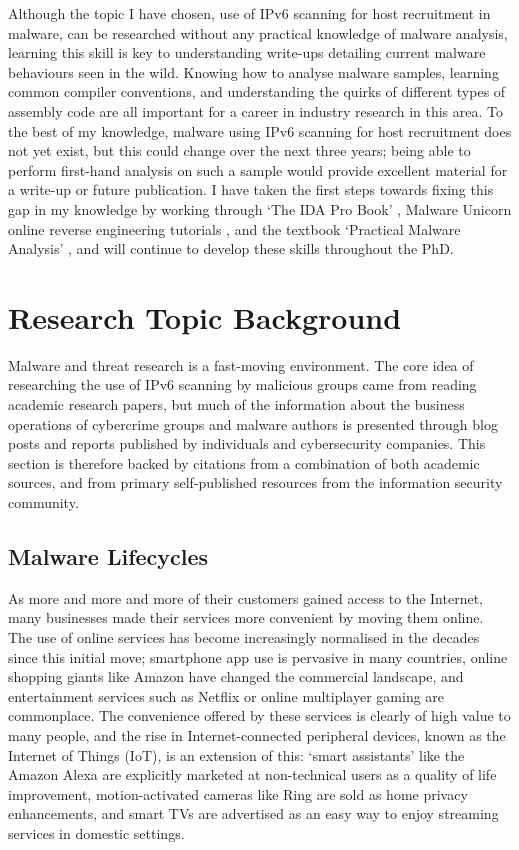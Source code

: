 \documentclass[10pt,sigconf]{acmart}
\begin{document}
Although the topic I have chosen, use of IPv6 scanning for host recruitment in malware, can be researched without any practical knowledge of malware analysis, learning this skill is key to understanding write-ups detailing current malware behaviours seen in the wild.
Knowing how to analyse malware samples, learning common compiler conventions, and understanding the quirks of different types of assembly code are all important for a career in industry research in this area.
To the best of my knowledge, malware using IPv6 scanning for host recruitment does not yet exist, but this could change over the next three years;
being able to perform first-hand analysis on such a sample would provide excellent material for a write-up or future publication.
I have taken the first steps towards fixing this gap in my knowledge by working through `The IDA Pro Book' \cite{ida-book}, Malware Unicorn online reverse engineering tutorials \cite{malware-unicorn}, and the textbook `Practical Malware Analysis' \cite{malware-analysis}, and will continue to develop these skills throughout the PhD.



\section{Research Topic Background}

Malware and threat research is a fast-moving environment.
The core idea of researching the use of IPv6 scanning by malicious groups came from reading academic research papers, but much of the information about the business operations of cybercrime groups and malware authors is presented through blog posts and reports published by individuals and cybersecurity companies.
This section is therefore backed by citations from a combination of both academic sources, and from primary self-published resources from the information security community.

\subsection{Malware Lifecycles}

As more and more and more of their customers gained access to the Internet, many businesses made their services more convenient by moving them online.
The use of online services has become increasingly normalised in the decades since this initial move;
smartphone app use is pervasive in many countries, online shopping giants like Amazon have changed the commercial landscape, and entertainment services such as Netflix or online multiplayer gaming are commonplace.
The convenience offered by these services is clearly of high value to many people, and the rise in Internet-connected peripheral devices, known as the Internet of Things (IoT), is an extension of this:
`smart assistants' like the Amazon Alexa are explicitly marketed at non-technical users as a quality of life improvement, motion-activated cameras like Ring are sold as home privacy enhancements, and smart TVs are advertised as an easy way to enjoy streaming services in domestic settings.
\end{document}
